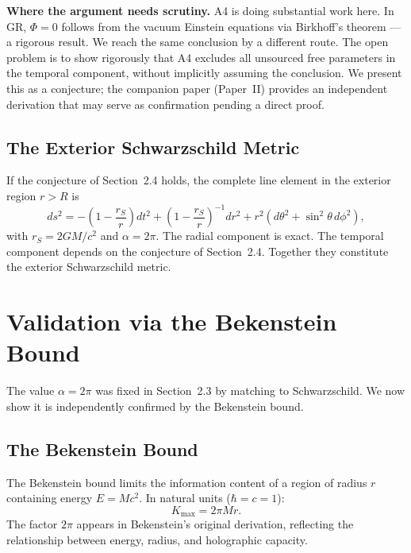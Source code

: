 \documentclass[12pt]{article}
\begin{document}
\medskip
\noindent\textbf{Where the argument needs scrutiny.}
A4 is doing substantial work here.
In GR, $\Phi = 0$ follows from the vacuum Einstein equations via
Birkhoff's theorem --- a rigorous result.
We reach the same conclusion by a different route.
The open problem is to show rigorously that A4 excludes all unsourced
free parameters in the temporal component, without implicitly assuming
the conclusion.
We present this as a conjecture; the companion paper (Paper~II) provides
an independent derivation that may serve as confirmation pending a
direct proof.

\subsection{The Exterior Schwarzschild Metric}
\label{sec:metric}

If the conjecture of Section~2.4 holds, the complete line element in
the exterior region $r > R$ is
\begin{equation}
  ds^2 = -\!\left(1 - \frac{r_S}{r}\right)dt^2
         + \left(1 - \frac{r_S}{r}\right)^{-1}dr^2
         + r^2\!\left(d\theta^2 + \sin^2\!\theta\,d\phi^2\right),
  \label{eq:schwarzschild}
\end{equation}
with $r_S = 2GM/c^2$ and $\alpha = 2\pi$.
The radial component is exact.
The temporal component depends on the conjecture of Section~2.4.
Together they constitute the exterior Schwarzschild metric.

\section{Validation via the Bekenstein Bound}

The value $\alpha = 2\pi$ was fixed in Section~2.3 by matching to
Schwarzschild.
We now show it is independently confirmed by the Bekenstein bound.

\subsection{The Bekenstein Bound}

The Bekenstein bound limits the information content of a region of
radius $r$ containing energy $E = Mc^2$.
In natural units ($\hbar = c = 1$):
\begin{equation}
  K_{\max} = 2\pi Mr.
  \label{eq:bekenstein-bound}
\end{equation}
The factor $2\pi$ appears in Bekenstein's original derivation,
reflecting the relationship between energy, radius, and holographic
capacity.
\end{document}
